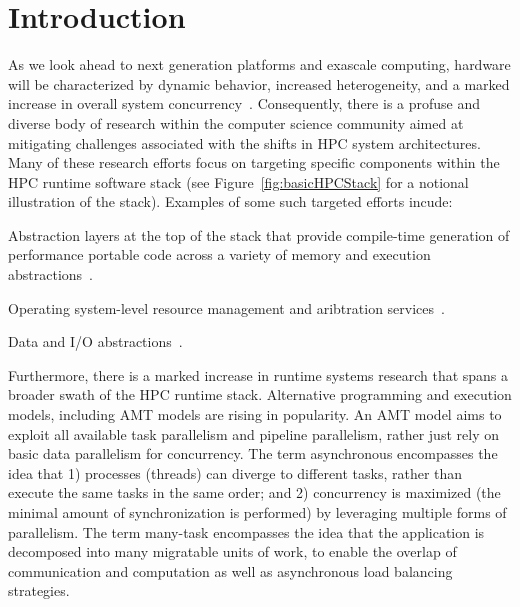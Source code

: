
\chapter{Introduction}
\label{chap:introduction}
As we look ahead to next generation platforms and exascale computing,  hardware 
will be characterized by dynamic behavior, increased
heterogeneity, and a marked increase in overall system \gls{concurrency}~\cite{doe_arch, dav_exascale}. 
Consequently, there is a profuse and diverse body of research within the
computer science community aimed at mitigating challenges associated with
the shifts in \gls{HPC} system architectures.  Many of these research efforts focus on targeting
specific components within the \gls{HPC} runtime software stack (see
Figure~\ref{fig:basicHPCStack} for a notional illustration of the stack).
Examples of some such targeted efforts incude:
\begin{compactenum}
\item Abstraction layers at the top of the stack that provide compile-time generation 
of performance portable code across a variety of memory and execution
abstractions~\cite{Kokkos, RAJA}. 
\item Operating system-level resource management and aribtration services~\cite{Qthreads, Hobbs, Kitten}. 
\item Data and I/O abstractions~\cite{Kelpie, Nessie, Adios, DataSpaces, LLNLandLANLDW}.  
\end{compactenum}

Furthermore, there is a marked increase in runtime systems
research that spans a broader swath of the \gls{HPC} runtime stack.  
Alternative programming  and \glspl{execution model}, including \gls{AMT}
models are rising in popularity.  
An \gls{AMT} model aims to exploit all available \gls{task parallelism} and
\gls{pipeline parallelism}, rather just rely on basic \gls{data parallelism}
for \gls{concurrency}. The term asynchronous encompasses the idea that 
1) processes (threads) can diverge to different tasks, rather than execute 
the same tasks in the same order; and 2) concurrency is maximized (the 
  minimal amount of synchronization is performed) by 
leveraging multiple forms of parallelism. The term many-task encompasses 
the idea that the application is decomposed into many 
\gls{migratable} units of work, to enable the overlap of communication and 
computation as well as asynchronous load balancing strategies.

